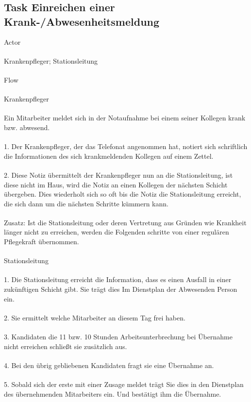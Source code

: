 \documentclass[11pt,
paper=a4,
bibtotocnumbered,	  %
liststotocnumbered,  %
DIV=calc,		  %
tablecaptionabove,	  %
headinclude,
]{article}
\begin{document}
\subsection{Task Einreichen einer Krank-/Abwesenheitsmeldung}
Actor\\\\
Krankenpfleger; Stationsleitung\\\\
Flow\\\\
Krankenpfleger\\\\
Ein Mitarbeiter meldet sich in der Notaufnahme bei einem seiner Kollegen krank bzw. abwesend.\\\\
1.	Der Krankenpfleger, der das Telefonat angenommen hat, notiert sich schriftlich die Informationen des sich krankmeldenden Kollegen auf einem Zettel.\\\\
2.	Diese Notiz übermittelt der Krankenpfleger nun an die Stationsleitung, ist diese nicht im Haus, wird die Notiz an einen Kollegen der nächsten Schicht übergeben. Dies wiederholt sich so oft bis die Notiz die Stationsleitung erreicht, die sich dann um die nächsten Schritte kümmern kann.\\\\
Zusatz: Ist die Stationsleitung oder deren Vertretung aus Gründen wie Krankheit länger nicht zu erreichen, werden die Folgenden schritte von einer regulären Pflegekraft übernommen.\\\\
Stationsleitung\\\\
1.	Die Stationsleitung erreicht die Information, dass es einen Ausfall in einer zukünftigen Schicht gibt. Sie trägt dies Im Dienstplan der Abwesenden Person ein. \\\\
2.	Sie ermittelt welche Mitarbeiter an diesem Tag frei haben.\\\\
3.	Kandidaten die 11 bzw. 10 Stunden Arbeitsunterbrechung bei Übernahme nicht erreichen schließt sie zusätzlich aus.\\\\
4.	Bei den übrig gebliebenen Kandidaten fragt sie eine Übernahme an.\\\\
5.	Sobald sich der erste mit einer Zusage meldet trägt Sie dies in den Dienstplan des übernehmenden Mitarbeiters ein. Und bestätigt ihm die Übernahme.\\\\
\end{document}
